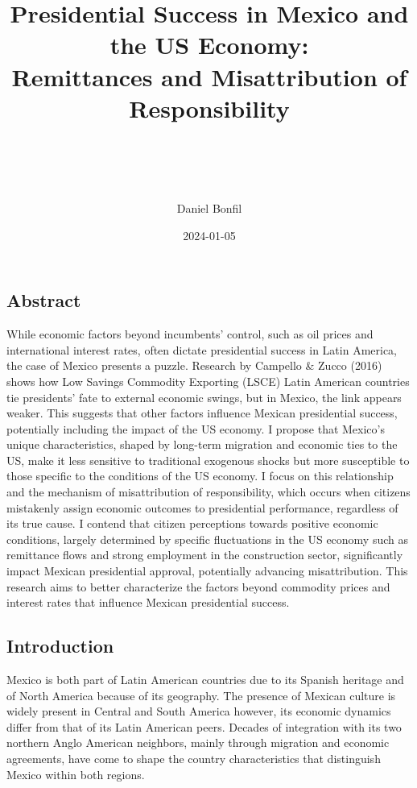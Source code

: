 \documentclass[
]{article}
\title{\hfill\break
\hfill\break
Presidential Success in Mexico and the US Economy:\\
Remittances and Misattribution of Responsibility\\
\strut \\}
\subtitle{\hfill\break
\hfill\break
FGV EBAPE\\
\strut \\
\strut \\
Comparative Political Economy\\
(Daniela Campello)\\
\strut \\}
\author{Daniel Bonfil}
\date{2024-01-05}
\begin{document}
\maketitle

{
\setcounter{tocdepth}{2}
\tableofcontents
}
\newpage
\doublespacing

\hypertarget{abstract}{%
\subsection{Abstract}\label{abstract}}

While economic factors beyond incumbents' control, such as oil prices
and international interest rates, often dictate presidential success in
Latin America, the case of Mexico presents a puzzle. Research by
Campello \& Zucco (2016) shows how Low Savings Commodity Exporting
(LSCE) Latin American countries tie presidents' fate to external
economic swings, but in Mexico, the link appears weaker. This suggests
that other factors influence Mexican presidential success, potentially
including the impact of the US economy. I propose that Mexico's unique
characteristics, shaped by long-term migration and economic ties to the
US, make it less sensitive to traditional exogenous shocks but more
susceptible to those specific to the conditions of the US economy. I
focus on this relationship and the mechanism of misattribution of
responsibility, which occurs when citizens mistakenly assign economic
outcomes to presidential performance, regardless of its true cause. I
contend that citizen perceptions towards positive economic conditions,
largely determined by specific fluctuations in the US economy such as
remittance flows and strong employment in the construction sector,
significantly impact Mexican presidential approval, potentially
advancing misattribution. This research aims to better characterize the
factors beyond commodity prices and interest rates that influence
Mexican presidential success.

\hypertarget{introduction}{%
\subsection{Introduction}\label{introduction}}

Mexico is both part of Latin American countries due to its Spanish
heritage and of North America because of its geography. The presence of
Mexican culture is widely present in Central and South America however,
its economic dynamics differ from that of its Latin American peers.
Decades of integration with its two northern Anglo American neighbors,
mainly through migration and economic agreements, have come to shape the
country characteristics that distinguish Mexico within both regions.
\end{document}
